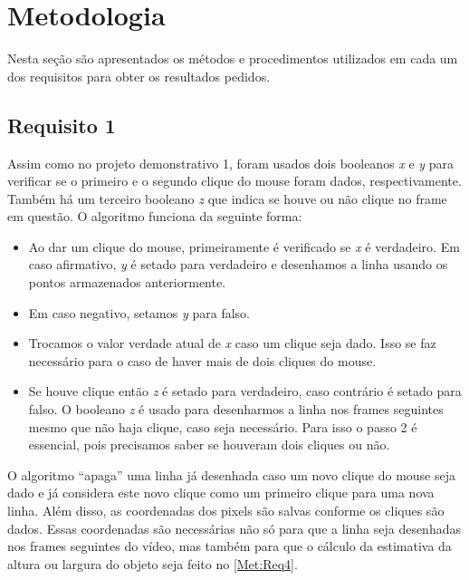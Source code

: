 \documentclass{bmvc2k}
\begin{document}
\section{Metodologia}
\label{sec:Methods}
Nesta seção são apresentados os métodos e procedimentos utilizados em cada um dos requisitos para obter os resultados pedidos.
\subsection{Requisito 1}
Assim como no projeto demonstrativo 1, foram usados dois booleanos \textit{x} e \textit{y} para verificar se o primeiro e o segundo clique do mouse foram dados, respectivamente. Também há um terceiro booleano \textit{z} que indica se houve ou não clique no frame em questão. O algoritmo funciona da seguinte forma:
\begin{itemize}
\item Ao dar um clique do mouse, primeiramente é verificado se \textit{x} é verdadeiro. Em caso afirmativo, \textit{y} é setado para verdadeiro e desenhamos a linha usando os pontos armazenados anteriormente.
\item Em caso negativo, setamos \textit{y} para falso.
\item Trocamos o valor verdade atual de \textit{x} caso um clique seja dado. Isso se faz necessário para o caso de haver mais de dois cliques do mouse.
\item Se houve clique então \textit{z} é setado para verdadeiro, caso contrário é setado para falso. O booleano \textit{z} é usado para desenharmos a linha nos frames seguintes mesmo que não haja clique, caso seja necessário. Para isso o passo 2 é essencial, pois precisamos saber se houveram dois cliques ou não.
\end{itemize}
O algoritmo ``apaga'' uma linha já desenhada caso um novo clique do mouse seja dado e já considera este novo clique como um primeiro clique para uma nova linha. Além disso, as coordenadas dos pixels são salvas conforme os cliques são dados. Essas coordenadas são necessárias não só para que a linha seja desenhadas nos frames seguintes do vídeo, mas também para que o cálculo da estimativa da altura ou largura do objeto seja feito no \ref{Met:Req4}.
\end{document}
